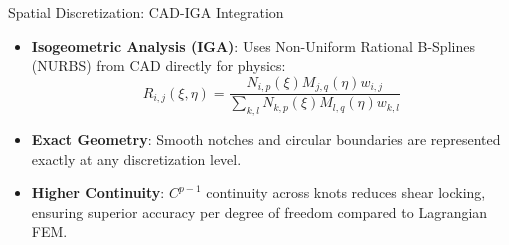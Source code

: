 \begin{frame}{Spatial Discretization: CAD-IGA Integration}
    \begin{itemize}
        \item \textbf{Isogeometric Analysis (IGA)}: Uses Non-Uniform Rational B-Splines (NURBS) from CAD directly for physics:
        \begin{equation*}
            R_{i,j}(\xi, \eta) = \frac{N_{i,p}(\xi) M_{j,q}(\eta) w_{i,j}}{\sum_{k,l} N_{k,p}(\xi) M_{l,q}(\eta) w_{k,l}}
        \end{equation*}
        \item \textbf{Exact Geometry}: Smooth notches and circular boundaries are represented exactly at any discretization level.
        \item \textbf{Higher Continuity}: $C^{p-1}$ continuity across knots reduces shear locking, ensuring superior accuracy per degree of freedom compared to Lagrangian FEM.
    \end{itemize}
    \centering
    \vspace{0.1cm}
\end{frame}


